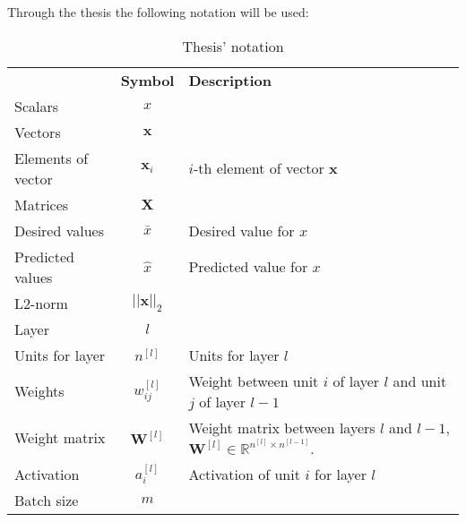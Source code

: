 
{}

Through the thesis the following notation will be used:

\begin{table}[H]
  \centering
  \begin{tabular}{l|c|p{6cm}}
     & \textbf{Symbol} & \textbf{Description} \\
    \hhline{===}
    Scalars & \( x \) & \\
    Vectors & \( \bm{x} \) & \\
    Elements of vector & \( \bm{x}_i \) & \( i \)-th element of vector \( \bm{x} \) \\
    Matrices & \(\bm{X}\) & \\
    Desired values & \( \bar{x} \) & Desired value for \( x \) \\
    Predicted values & \( \hat{x} \) & Predicted value for \( x \) \\
    L2-norm & \( ||\bm{x}||_2 \) & \\
    \hline
    Layer & \( l \) & \\
    Units for layer & \( n^{[l]} \) & Units for layer \( l \) \\
    Weights & \( w_{ij}^{[l]} \) & Weight between unit \( i \) of layer \( l \) and unit
    \( j \) of layer \( l - 1 \) \\
    Weight matrix & \( \bm{W}^{[l]} \) & Weight 
    matrix between layers \( l \) and \( l - 1 \), 
    \( \bm{W}^{[l]} \in \mathbb{R}^{n^{[l]} \times n^{[l - 1]}} \). \\
    Activation & \( a_i^{[l]} \) & Activation of unit \( i \) for layer \( l \) \\
    Batch size & \( m \) & \\
  \end{tabular}
  \caption{Thesis' notation}
\end{table}

